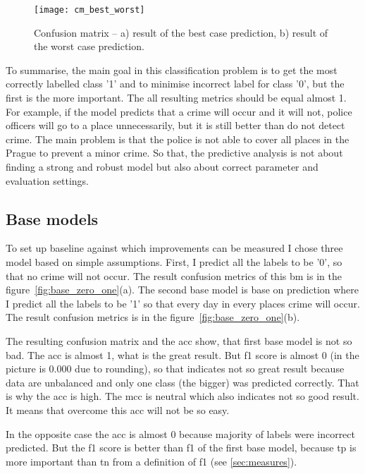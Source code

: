\documentclass[thesis=M,english]{FITthesis}[2012/10/20]
\begin{document}
\begin{figure}[ht]\centering
    \texttt{[image: cm\_best\_worst]}
    \caption{Confusion matrix -- a) result of the best case prediction, b) result of the worst case prediction.}\label{fig:base_best_worst}
\end{figure}

To summarise, the main goal in this classification problem is to get the most correctly labelled class '1' and to minimise incorrect label for class '0', but the first is the more important. The all resulting metrics should be equal almost 1. For example, if the model predicts that a crime will occur and it will not, police officers will go to a place unnecessarily, but it is still better than do not detect crime. The main problem is that the police is not able to cover all places in the Prague to prevent a minor crime. So that, the predictive analysis is not about finding a strong and robust model but also about correct parameter and evaluation settings.

\subsection{Base models}

To set up baseline against which improvements can be measured I chose three model based on simple assumptions. First, I predict all the labels to be '0', so that no crime will not occur. The result confusion metrics of this \gls{bm} is in the figure~\ref{fig:base_zero_one}(a). The second base model is base on prediction where I predict all the labels to be '1' so that every day in every places crime will occur. The result confusion metrics is in the figure~\ref{fig:base_zero_one}(b).

The resulting confusion matrix and the \gls{acc} show, that first base model is not so bad. The \gls{acc} is almost 1, what is the great result. But \gls{f1} score is almost 0 (in the picture is 0.000 due to rounding), so that indicates not so great result because data are unbalanced and only one class (the bigger) was predicted correctly. That is why the \gls{acc} is high. The \gls{mcc} is neutral which also indicates not so good result. It means that overcome this \gls{acc} will not be so easy.

In the opposite case the \gls{acc} is almost 0 because majority of labels were incorrect predicted. But the \gls{f1} score is better than \gls{f1} of the first base model, because \gls{tp} is more important than \gls{tn} from a definition of \gls{f1} (see \ref{sec:measures}). 
\end{document}
